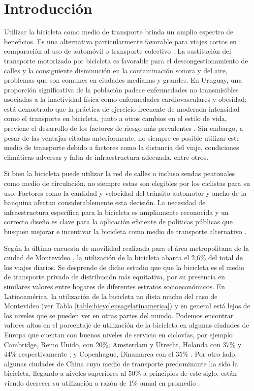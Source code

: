 \chapter{Introducción}

  Utilizar la bicicleta como medio de transporte brinda un amplio espectro de beneficios. Es una alternativa particularmente favorable para viajes cortos en comparación al uso de automóvil o transporte colectivo \parencite{Hull2014}. La sustitución del transporte motorizado por bicicleta es favorable para el descongestionamiento de calles y la consiguiente disminución en la contaminación sonora y del aire, problemas que son comunes en ciudades medianas y grandes. En Uruguay, una proporción significativa de la población padece enfermedades no transmisibles asociadas a la inactividad física como enfermedades cardiovasculares y obesidad; está demostrado que la práctica de ejercicio frecuente de moderada intensidad como el transporte en bicicleta, junto a otros cambios en el estilo de vida, previene el desarrollo de los factores de riesgo más prevalentes \parencite{heartrisksuy, mspphisicalactivityguid, mspsurveyriskfactors}. Sin embargo, a pesar de las ventajas citadas anteriormente, no siempre es posible utilizar este medio de transporte debido a factores como la distancia del viaje, condiciones climáticas adversas y falta de infraestructura adecuada, entre otros.

  Si bien la bicicleta puede utilizar la red de calles o incluso sendas peatonales como medio de circulación, no siempre estas son elegibles por los ciclistas para su uso. Factores como la cantidad y velocidad del tránsito automotor y ancho de la banquina afectan considerablemente esta decisión. La necesidad de infraestructura específica para la bicicleta es ampliamente reconocida y un correcto diseño es clave para la aplicación eficiente de políticas públicas que busquen mejorar e incentivar la bicicleta como medio de transporte alternativo \parencite{Hunt2007}.

  Según la última encuesta de movilidad realizada para el área metropolitana de la ciudad de Montevideo \parencite{Mauttone2017a}, la utilización de la bicicleta abarca el 2,6\% del total de los viajes diarios. Se desprende de dicho estudio que que la bicicleta es el medio de transporte privado de distribución más equitativa, por su presencia en similares valores entre hogares de diferentes estratos socioeconómicos. En Latinoamérica, la utilización de la bicicleta no dista mucho del caso de Montevideo (ver Tabla \ref{table:bicycleusagelatinamerica}) y en general está lejos de los niveles que se pueden ver en otras partes del mundo. Podemos encontrar valores altos en el porcentaje de utilización de la bicicleta en algunas ciudades de Europa que cuentan con buenos niveles de servicio en ciclovías, por ejemplo Cambridge, Reino Unido, con 20\%; Amsterdam y Utrecht, Holanda con 37\% y 44\% respectivamente \parencite{Hull2014}; y Copenhague, Dinamarca con el 35\% \parencite{Vedel2017}. Por otro lado, algunas ciudades de China cuyo medio de transporte predominante ha sido la bicicleta, llegando a niveles superiores al 50\% a principios de este siglo, están viendo decrecer su utilización a razón de 1\% anual en promedio \parencite{Li2017}.

